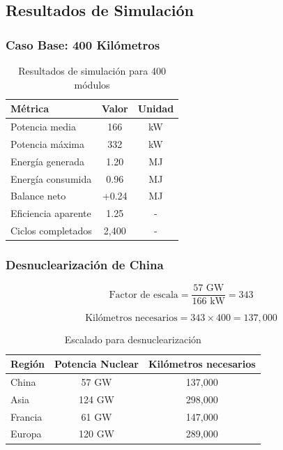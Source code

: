 \documentclass[12pt,a4paper]{article}
\begin{document}
\subsection{Resultados de Simulación}

\subsubsection{Caso Base: 400 Kilómetros}

\begin{table}[H]
\centering
\caption{Resultados de simulación para 400 módulos}
\label{tab:resultados}
\begin{tabular}{@{}lcc@{}}
\toprule
\textbf{Métrica} & \textbf{Valor} & \textbf{Unidad} \\
\midrule
Potencia media & 166 & kW \\
Potencia máxima & 332 & kW \\
Energía generada & 1.20 & MJ \\
Energía consumida & 0.96 & MJ \\
Balance neto & +0.24 & MJ \\
Eficiencia aparente & 1.25 & - \\
Ciclos completados & 2,400 & - \\
\bottomrule
\end{tabular}
\end{table}

\subsubsection{Desnuclearización de China}

\begin{equation}
\text{Factor de escala} = \frac{57 \text{ GW}}{166 \text{ kW}} = 343
\end{equation}

\begin{equation}
\text{Kilómetros necesarios} = 343 \times 400 = 137,000
\end{equation}

\begin{table}[H]
\centering
\caption{Escalado para desnuclearización}
\label{tab:escalado}
\begin{tabular}{@{}lcc@{}}
\toprule
\textbf{Región} & \textbf{Potencia Nuclear} & \textbf{Kilómetros necesarios} \\
\midrule
China & 57 GW & 137,000 \\
Asia & 124 GW & 298,000 \\
Francia & 61 GW & 147,000 \\
Europa & 120 GW & 289,000 \\
\bottomrule
\end{tabular}
\end{table}
\end{document}
